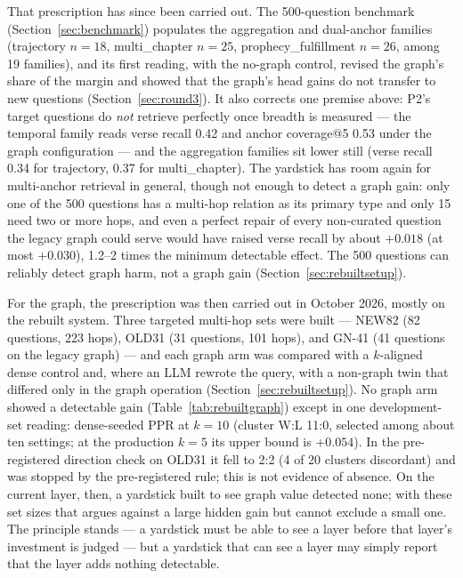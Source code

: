 That prescription has since been carried out. The 500-question benchmark
(Section~\ref{sec:benchmark}) populates the aggregation and dual-anchor
families (trajectory $n=18$, multi\_chapter $n=25$,
prophecy\_fulfillment $n=26$, among 19 families), and its first
reading, with the no-graph control, revised the graph's share of the
margin and showed that the graph's head gains do not transfer to new
questions (Section~\ref{sec:round3}). It also corrects one premise
above: P2's target questions do \emph{not} retrieve perfectly once
breadth is measured --- the temporal family reads verse recall 0.42 and
anchor coverage@5 0.53 under the graph configuration ---
and the aggregation families sit lower still (verse recall 0.34 for
trajectory, 0.37 for multi\_chapter). The yardstick has room again for
multi-anchor retrieval in general, though not enough to detect a graph
gain: only one of the 500 questions has a multi-hop relation as its
primary type and only 15 need two or more hops, and even a perfect
repair of every non-curated question the legacy graph could serve would
have raised verse recall by about $+0.018$ (at most $+0.030$), 1.2--2
times the minimum detectable effect. The 500 questions can reliably
detect graph harm, not a graph gain (Section~\ref{sec:rebuiltsetup}).

For the graph, the prescription was then carried out in October 2026,
mostly on the rebuilt system. Three targeted multi-hop sets were built
--- NEW82 (82 questions, 223 hops), OLD31 (31 questions, 101 hops), and GN-41 (41
questions on the legacy graph) --- and each graph arm was compared with
a $k$-aligned dense control and, where an LLM rewrote the query, with a
non-graph twin that differed only in the graph operation
(Section~\ref{sec:rebuiltsetup}). No graph arm showed a detectable gain
(Table~\ref{tab:rebuiltgraph}) except in one development-set reading:
dense-seeded PPR at $k=10$ (cluster W:L 11:0, selected among about ten
settings; at the production $k=5$ its upper bound is $+0.054$). In the
pre-registered direction check on OLD31 it fell to 2:2 (4 of 20
clusters discordant) and was stopped by the pre-registered rule; this
is not evidence of absence. On the current layer, then, a yardstick
built to see graph value detected none; with these set sizes that
argues against a large hidden gain but cannot exclude a small one.
The principle stands --- a yardstick must be able to see a layer before
that layer's investment is judged --- but a yardstick that can see a
layer may simply report that the layer adds nothing detectable.

